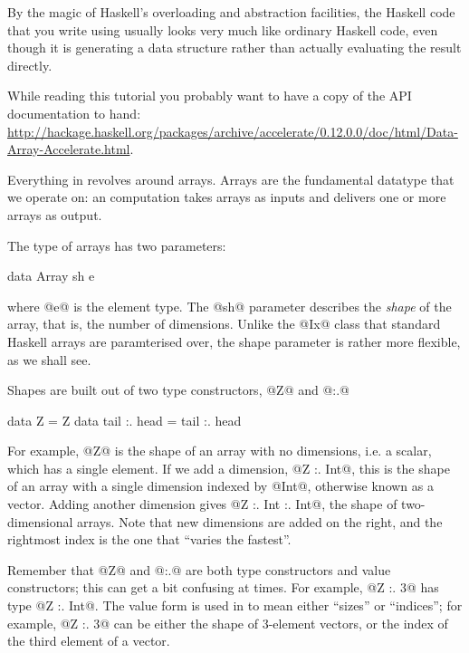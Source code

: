 By the magic of Haskell's overloading and abstraction facilities, the
Haskell code that you write using \acc{} usually looks very much like
ordinary Haskell code, even though it is generating a data structure
rather than actually evaluating the result directly.

While reading this tutorial you probably want to have a copy of the
\acc{} API documentation to hand: \url{http://hackage.haskell.org/packages/archive/accelerate/0.12.0.0/doc/html/Data-Array-Accelerate.html}.


Everything in \acc{} revolves around arrays.  Arrays are the
fundamental datatype that we operate on: an \acc{} computation takes
arrays as inputs and delivers one or more arrays as output.

The type of arrays has two parameters:

\begin{haskell}
data Array sh e
\end{haskell}

\noindent where @e@ is the element type.  The @sh@ parameter
describes the \emph{shape} of the array, that is, the number
of dimensions.  Unlike the @Ix@ class that standard Haskell arrays are
paramterised over, the shape parameter is rather more flexible, as we
shall see.

Shapes are built out of two type constructors, @Z@ and @:.@

\begin{haskell}
data Z = Z
data tail :. head = tail :. head
\end{haskell}

For example, @Z@ is the shape of an array with no dimensions, i.e. a
scalar, which has a single element.  If we add a dimension, @Z :. Int@, this is the shape of an array with a single dimension indexed
by @Int@, otherwise known as a vector.  Adding another dimension gives
@Z :. Int :. Int@, the shape of two-dimensional arrays.  Note that new
dimensions are added on the right, and the rightmost index is the one
that ``varies the fastest''.

Remember that @Z@ and @:.@ are both type constructors and value
constructors; this can get a bit confusing at times.  For example, @Z :. 3@ has type @Z :. Int@.  The value form is used in \acc{} to mean
either ``sizes'' or ``indices''; for example, @Z :. 3@ can be either
the shape of 3-element vectors, or the index of the third element of a
vector.

